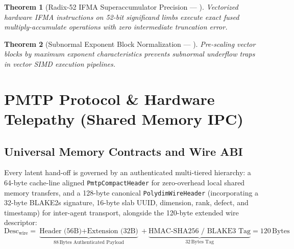 \documentclass[journal,10pt,compsoc]{IEEEtran}
\theoremstyle{plain}
\newtheorem{theorem}{Theorem}
\theoremstyle{definition}
\begin{document}
\begin{theorem}[Radix-52 IFMA Superaccumulator Precision --- \label{thm:polydim_0827}]
Vectorized hardware IFMA instructions on 52-bit significand limbs execute exact fused multiply-accumulate operations with zero intermediate truncation error.
\end{theorem}

\begin{theorem}[Subnormal Exponent Block Normalization --- \label{thm:polydim_0881}]
Pre-scaling vector blocks by maximum exponent characteristics prevents subnormal underflow traps in vector SIMD execution pipelines.
\end{theorem}

\section{PMTP Protocol \& Hardware Telepathy (Shared Memory IPC)}
\label{sec:pmtp}

\subsection{Universal Memory Contracts and Wire ABI}
Every latent hand-off is governed by an authenticated multi-tiered hierarchy: a 64-byte cache-line aligned \texttt{PmtpCompactHeader} for zero-overhead local shared memory transfers, and a 128-byte canonical \texttt{PolydimWireHeader} (incorporating a 32-byte BLAKE2s signature, 16-byte slab UUID, dimension, rank, defect, and timestamp) for inter-agent transport, alongside the 120-byte extended wire descriptor:
\begin{equation}
\label{eq:descriptor_wire}
\text{Desc}_{\text{wire}} = \underbrace{\text{Header (56B)} + \text{Extension (32B)}}_{88\,\text{Bytes Authenticated Payload}} + \underbrace{\text{HMAC-SHA256 / BLAKE3 Tag}}_{32\,\text{Bytes Tag}} = 120\,\text{Bytes}
\end{equation}
\end{document}
